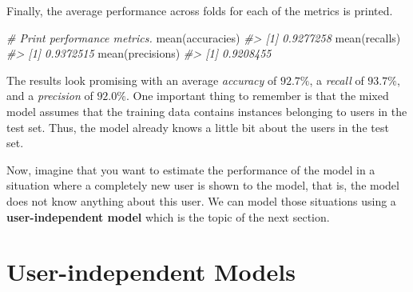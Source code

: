 \documentclass[
  11pt,
]{krantz}
\newenvironment{Shaded}{\begin{snugshade}}{\end{snugshade}}
\newcommand{\AttributeTok}[1]{\textcolor[rgb]{0.61,0.61,0.61}{#1}}
\newcommand{\CommentTok}[1]{\textcolor[rgb]{0.37,0.37,0.37}{\textit{#1}}}
\newcommand{\ConstantTok}[1]{\textcolor[rgb]{0,0,0}{#1}}
\newcommand{\FunctionTok}[1]{\textcolor[rgb]{0,0,0}{#1}}
\newcommand{\NormalTok}[1]{#1}
\newcommand{\OtherTok}[1]{\textcolor[rgb]{0.37,0.37,0.37}{#1}}
\newcommand{\SpecialCharTok}[1]{\textcolor[rgb]{0,0,0}{#1}}
\newcommand{\StringTok}[1]{\textcolor[rgb]{0.5,0.5,0.5}{#1}}
\begin{document}
\begin{Shaded}
\end{Shaded}

Finally, the average performance across folds for each of the metrics is printed.

\begin{Shaded}
\begin{Highlighting}[]
\CommentTok{\# Print performance metrics.}
\FunctionTok{mean}\NormalTok{(accuracies)}
\CommentTok{\#\textgreater{} [1] 0.9277258}
\FunctionTok{mean}\NormalTok{(recalls)}
\CommentTok{\#\textgreater{} [1] 0.9372515}
\FunctionTok{mean}\NormalTok{(precisions)}
\CommentTok{\#\textgreater{} [1] 0.9208455}
\end{Highlighting}
\end{Shaded}

The results look promising with an average \emph{accuracy} of \(92.7\%\), a \emph{recall} of \(93.7\%\), and a \emph{precision} of \(92.0\%\). One important thing to remember is that the mixed model assumes that the training data contains instances belonging to users in the test set. Thus, the model already knows a little bit about the users in the test set.

Now, imagine that you want to estimate the performance of the model in a situation where a completely new user is shown to the model, that is, the model does not know anything about this user. We can model those situations using a \textbf{user-independent model} which is the topic of the next section.

\hypertarget{user-independent-models}{%
\section{User-independent Models}\label{user-independent-models}}
\end{document}
